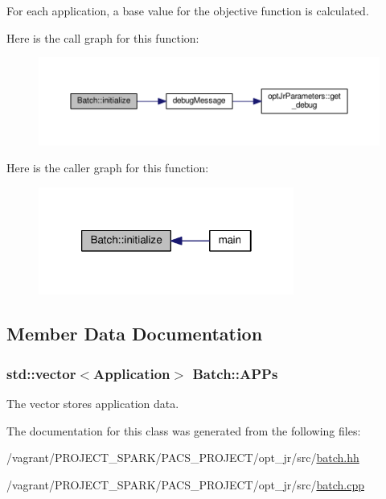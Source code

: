 For each application, a base value for the objective function is calculated. 



Here is the call graph for this function\-:\nopagebreak
\begin{figure}[H]
\begin{center}
\leavevmode
\includegraphics[width=350pt]{classBatch_ae212d22fa812b51160f57507242152c1_cgraph}
\end{center}
\end{figure}




Here is the caller graph for this function\-:\nopagebreak
\begin{figure}[H]
\begin{center}
\leavevmode
\includegraphics[width=238pt]{classBatch_ae212d22fa812b51160f57507242152c1_icgraph}
\end{center}
\end{figure}




\subsection{Member Data Documentation}
\hypertarget{classBatch_a757bf1a36fee46b1b47263ab4a59c560}{
\subsubsection[{A\-P\-Ps}]{\setlength{\rightskip}{0pt plus 5cm}std\-::vector$<${\bf Application}$>$ Batch\-::\-A\-P\-Ps}}\label{classBatch_a757bf1a36fee46b1b47263ab4a59c560}


The vector stores application data. 



The documentation for this class was generated from the following files\-:\begin{DoxyCompactItemize}
\item 
/vagrant/\-P\-R\-O\-J\-E\-C\-T\-\_\-\-S\-P\-A\-R\-K/\-P\-A\-C\-S\-\_\-\-P\-R\-O\-J\-E\-C\-T/opt\-\_\-jr/src/\hyperlink{batch_8hh}{batch.\-hh}\item 
/vagrant/\-P\-R\-O\-J\-E\-C\-T\-\_\-\-S\-P\-A\-R\-K/\-P\-A\-C\-S\-\_\-\-P\-R\-O\-J\-E\-C\-T/opt\-\_\-jr/src/\hyperlink{batch_8cpp}{batch.\-cpp}\end{DoxyCompactItemize}
